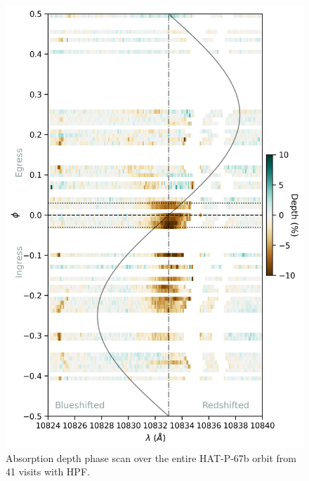 \documentclass[twocolumn]{aastex631}
\begin{document}
\begin{figure}
    \includegraphics[width=\linewidth]{figures/phase_2D_diagram_resid.png}
    \caption{Absorption depth phase scan over the entire HAT-P-67b orbit from 41 visits with HPF.  }
    \label{fig:HPFscanResid}
\end{figure}
\end{document}
